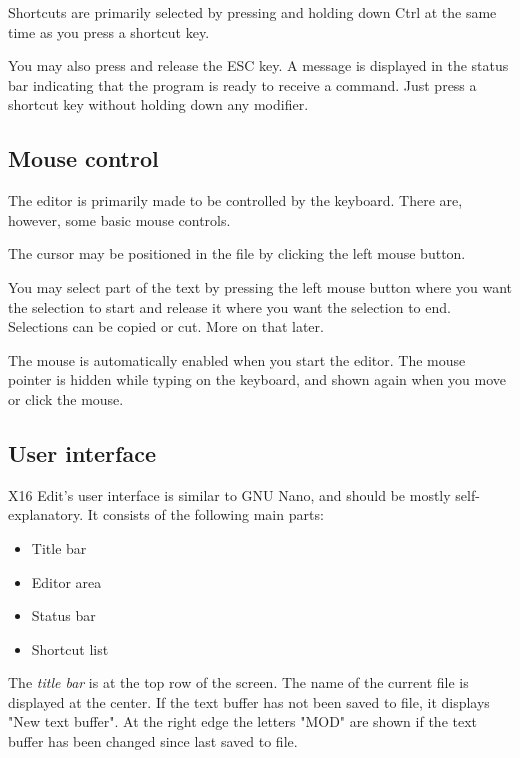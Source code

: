 \documentclass{article}
\begin{document}
        Shortcuts are primarily selected by pressing and holding down Ctrl at the
        same time as you press a shortcut key.

        You may also press and release the ESC key. A message is displayed
        in the status bar indicating that the program is ready to receive a command.
        Just press a shortcut key without holding down any modifier.

    \subsection{Mouse control}
        The editor is primarily made to be controlled by the keyboard. There are, however,
        some basic mouse controls.

        The cursor may be positioned in the file by clicking the left mouse button.

        You may select part of the text by pressing the left mouse button where
        you want the selection to start and release it where you want the selection to end. 
        Selections can be copied or cut. More on that later.

        The mouse is automatically enabled when you start the editor. The mouse pointer 
        is hidden while typing on the keyboard, and shown again when you move or click the mouse.
    
    \subsection{User interface}
        X16 Edit's user interface is similar to GNU Nano, and should be mostly self-explanatory.
        It consists of the following main parts:

        \begin{itemize}
            \item Title bar
            \item Editor area
            \item Status bar
            \item Shortcut list
        \end{itemize}

        The \textit{title bar} is at the top row of the screen. The name of the current file
        is displayed at the center. If the text buffer has not been saved to file, it displays
        "New text buffer". At the right edge the letters "MOD" are shown if the
        text buffer has been changed since last saved to file.
\end{document}
